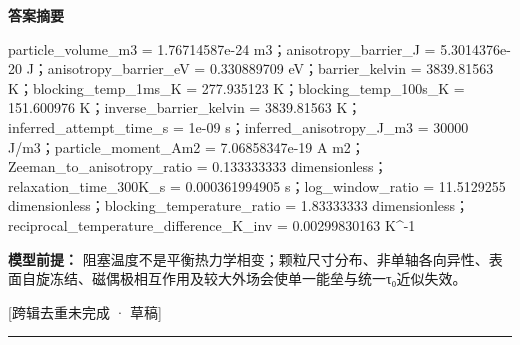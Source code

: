 \documentclass[UTF8,11pt,a4paper]{ctexart}
\begin{document}
\noindent\textbf{答案摘要}\par
particle\_volume\_m3 = 1.76714587e-24 m3；anisotropy\_barrier\_J = 5.3014376e-20 J；anisotropy\_barrier\_eV = 0.330889709 eV；barrier\_kelvin = 3839.81563 K；blocking\_temp\_1ms\_K = 277.935123 K；blocking\_temp\_100s\_K = 151.600976 K；inverse\_barrier\_kelvin = 3839.81563 K；inferred\_attempt\_time\_s = 1e-09 s；inferred\_anisotropy\_J\_m3 = 30000 J/m3；particle\_moment\_Am2 = 7.06858347e-19 A m2；Zeeman\_to\_anisotropy\_ratio = 0.133333333 dimensionless；relaxation\_time\_300K\_s = 0.000361994905 s；log\_window\_ratio = 11.5129255 dimensionless；blocking\_temperature\_ratio = 1.83333333 dimensionless；reciprocal\_temperature\_difference\_K\_inv = 0.00299830163 K\textasciicircum{}-1\par
\noindent\textbf{模型前提：}
阻塞温度不是平衡热力学相变；颗粒尺寸分布、非单轴各向异性、表面自旋冻结、磁偶极相互作用及较大外场会使单一能垒与统一τ₀近似失效。\par
\noindent\textcolor{red!65!black}{[跨辑去重未完成 · 草稿]} \par
\medskip\hrule\medskip
{}
\end{document}
